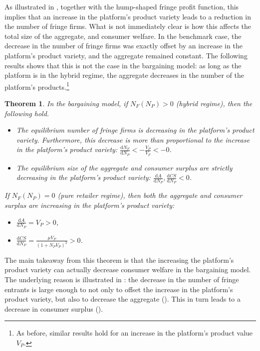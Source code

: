 \documentclass[a4paper]{article}
\newtheorem{theorem}{Theorem}
\newcommand{\dd}{\mathrm{d}}
\begin{document}
As illustrated in , together with the hump-shaped fringe profit function, this implies that an increase in the platform's product variety leads to a reduction in the number of fringe firms.
What is not immediately clear is how this affects the total size of the aggregate, and consumer welfare.
In the benchmark case, the decrease in the number of fringe firms was exactly offset by an increase in the platform's product variety, and the aggregate remained constant.
The following results shows that this is not the case in the bargaining model: as long as the platform is in the hybrid regime, the aggregate decreases in the number of the platform's products.\footnote{
    As before, similar results hold for an increase in the platform's product value $V_P$.
}

\begin{theorem}
    \label{prop:equilibrium_bargaining}
    In the bargaining model, if $N_F(N_P) > 0$ (hybrid regime), then the following hold.
    \begin{itemize}
        \item The equilibrium number of fringe firms is decreasing in the platform's product variety. Furthermore, this decrease is more than proportional to the increase in the platform's product variety: $\frac{\dd N_F}{\dd N_P} < -\frac{V_P}{V_F} < -0$.
        \item The equilibrium size of the aggregate and consumer surplus are strictly decreasing in the platform's product variety: $\frac{\dd A}{\dd N_P}, \frac{\dd CS}{\dd N_P} < 0$.
    \end{itemize}
    If $N_F(N_P) = 0$ (pure retailer regime), then both the aggregate and consumer surplus are increasing in the platform's product variety:
    \begin{itemize}
        \item $\frac{\dd A}{\dd N_P} = V_P > 0$,
        \item $\frac{\dd CS}{\dd N_P} = \frac{\mu V_P}{(1 + N_P V_P)^2} > 0$.
    \end{itemize}
\end{theorem}

The main takeaway from this theorem is that the increasing the platform's product variety can actually decrease consumer welfare in the bargaining model.
The underlying reason is illustrated in : the decrease in the number of fringe entrants is large enough to not only to offset the increase in the platform's product variety, but also to decrease the aggregate ().
This in turn leads to a decrease in consumer surplus ().
\end{document}
